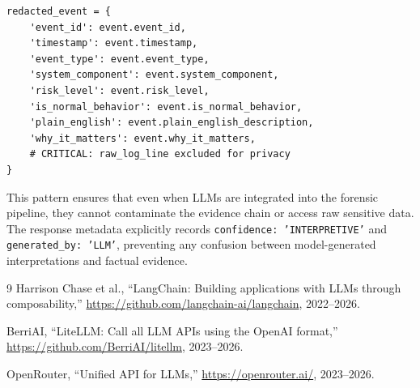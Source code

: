 \documentclass[11pt,a4paper]{article}
\theoremstyle{plain}
\theoremstyle{definition}
\begin{document}
\begin{lstlisting}[style=pythonstyle, caption={Privacy-preserving prompt construction from \texttt{llm\_narrative.py}}]
redacted_event = {
    'event_id': event.event_id,
    'timestamp': event.timestamp,
    'event_type': event.event_type,
    'system_component': event.system_component,
    'risk_level': event.risk_level,
    'is_normal_behavior': event.is_normal_behavior,
    'plain_english': event.plain_english_description,
    'why_it_matters': event.why_it_matters,
    # CRITICAL: raw_log_line excluded for privacy
}
\end{lstlisting}

This pattern ensures that even when LLMs are integrated into the forensic
pipeline, they cannot contaminate the evidence chain or access raw sensitive
data. The response metadata explicitly records \texttt{confidence:
'INTERPRETIVE'} and \texttt{generated\_by: 'LLM'}, preventing any confusion
between model-generated interpretations and factual evidence.

\begin{thebibliography}{9}
  Harrison Chase et al., ``LangChain: Building applications with LLMs through
  composability,'' \url{https://github.com/langchain-ai/langchain}, 2022--2026.

  BerriAI, ``LiteLLM: Call all LLM APIs using the OpenAI format,''
  \url{https://github.com/BerriAI/litellm}, 2023--2026.

  OpenRouter, ``Unified API for LLMs,'' \url{https://openrouter.ai/}, 2023--2026.
\end{thebibliography}
\end{document}
